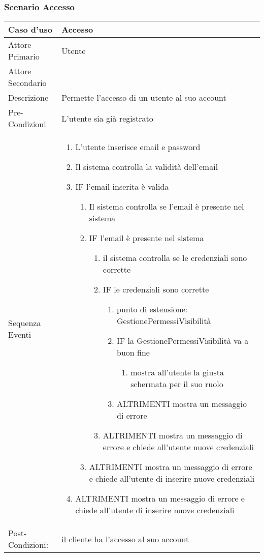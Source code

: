 \subsubsection{Scenario Accesso}
\begin{tabular}{|p{3cm}|p{7cm}|}
\hline 
\rowcolor{Orchid}
Caso d'uso & Accesso \\
\hline
Attore Primario & Utente\\
\hline
Attore Secondario & \\
\hline
Descrizione & Permette l'accesso di un utente al suo account\\
\hline
Pre-Condizioni& L'utente sia già registrato\\
\hline
  Sequenza Eventi&
\begin{enumerate}
  \item L'utente inserisce email e password
\item Il sistema controlla la validità dell'email
\item IF l'email inserita è valida
\begin{enumerate}
  \item Il sistema controlla se l'email è presente nel sistema
  \item IF l'email è presente nel sistema
\begin{enumerate}
  \item il sistema controlla se le credenziali sono corrette
\item IF le credenziali sono corrette
\begin{enumerate}
  \item punto di estensione: GestionePermessiVisibilità
\item IF la GestionePermessiVisibilità va a buon fine
\begin{enumerate}
  \item mostra all'utente la giusta schermata per il suo ruolo
\end{enumerate}
\item ALTRIMENTI mostra un messaggio di errore
\end{enumerate}
\item ALTRIMENTI mostra un messaggio di errore e chiede
all'utente nuove credenziali
\end{enumerate}
\item ALTRIMENTI mostra un messaggio di errore e
chiede all'utente di inserire nuove credenziali
\end{enumerate}
\item ALTRIMENTI mostra un messaggio di errore e
chiede all'utente di inserire nuove credenziali
\end{enumerate}\\
\hline
Post-Condizioni: &il cliente ha l'accesso al suo account \\
  \hline
\end{tabular}\\
